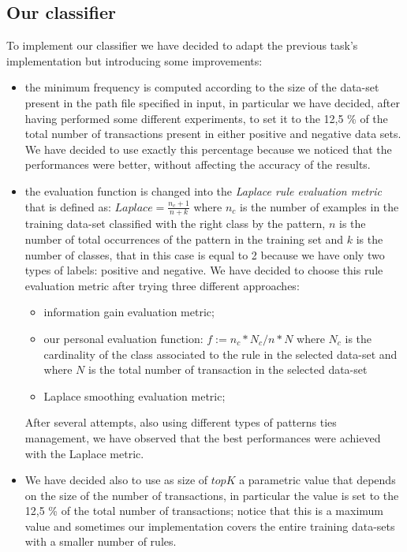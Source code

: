 \documentclass[11pt, a4paper]{article}
\begin{document}
		\subsection{Our classifier}
			To implement our classifier we have decided to adapt the previous task's implementation but introducing some improvements:
			\begin{itemize}
				\item the minimum frequency is computed according to the size of the data-set present in the path file specified in input, in particular we have decided, after having performed some different experiments, to set it to the 12,5 \% of the total number of transactions present in either positive and negative data sets. We have decided to use exactly this percentage because we noticed that the performances were better, without affecting the accuracy of the results.
				\item the evaluation function is changed into the \textit{Laplace rule evaluation metric} that is defined as: $Laplace = \frac{n_c +1}{n + k}$ where $n_c$ is the number of examples in the training data-set classified with the right class by the pattern, $n$ is the number of total occurrences of the pattern in the training set and $k$ is the number of classes, that in this case is equal to 2 because we have only two types of labels: positive and negative.
				We have decided to choose this rule evaluation metric after trying three different approaches:
				\begin{itemize}
					\item information gain evaluation metric;
					\item our personal evaluation function: $f := n_c * N_c / n * N$ where $N_c$ is the cardinality of the class associated to the rule  in the selected data-set and where $N$ is the total number of transaction in the selected data-set 
					\item Laplace smoothing evaluation metric;
				\end{itemize}
				After several attempts, also using different types of patterns ties management, we have observed that the best performances were achieved with the Laplace metric. 
				\item We have decided also to use as size of $topK$ a parametric value that depends on the size of the number of transactions, in particular the value is set to the 12,5 \% of the total number of transactions; notice that this is a maximum value and sometimes our implementation covers the entire training data-sets with a smaller number of rules.	
			\end{itemize}
			
\end{document}
